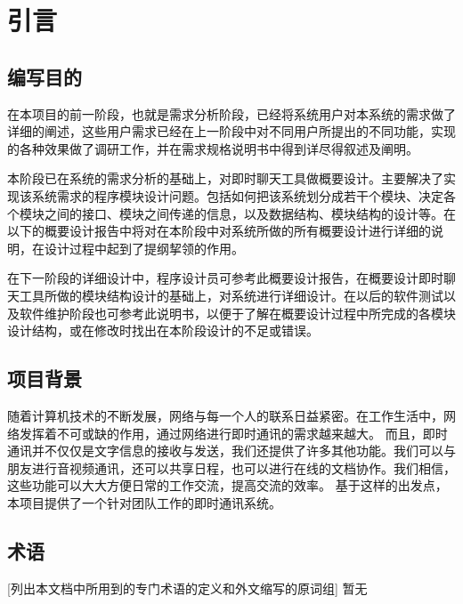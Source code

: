 \chapter{引言}

\section{编写目的}
在本项目的前一阶段，也就是需求分析阶段，已经将系统用户对本系统的需求做了详细的阐述，这些用户需求已经在上一阶段中对不同用户所提出的不同功能，实现的各种效果做了调研工作，并在需求规格说明书中得到详尽得叙述及阐明。

本阶段已在系统的需求分析的基础上，对即时聊天工具做概要设计。主要解决了实现该系统需求的程序模块设计问题。包括如何把该系统划分成若干个模块、决定各个模块之间的接口、模块之间传递的信息，以及数据结构、模块结构的设计等。在以下的概要设计报告中将对在本阶段中对系统所做的所有概要设计进行详细的说明，在设计过程中起到了提纲挈领的作用。

在下一阶段的详细设计中，程序设计员可参考此概要设计报告，在概要设计即时聊天工具所做的模块结构设计的基础上，对系统进行详细设计。在以后的软件测试以及软件维护阶段也可参考此说明书，以便于了解在概要设计过程中所完成的各模块设计结构，或在修改时找出在本阶段设计的不足或错误。


\section{项目背景}
随着计算机技术的不断发展，网络与每一个人的联系日益紧密。在工作生活中，网络发挥着不可或缺的作用，通过网络进行即时通讯的需求越来越大。
而且，即时通讯并不仅仅是文字信息的接收与发送，我们还提供了许多其他功能。我们可以与朋友进行音视频通讯，还可以共享日程，也可以进行在线的文档协作。我们相信，这些功能可以大大方便日常的工作交流，提高交流的效率。
基于这样的出发点，本项目提供了一个针对团队工作的即时通讯系统。

\section{术语}
[列出本文档中所用到的专门术语的定义和外文缩写的原词组]
暂无
